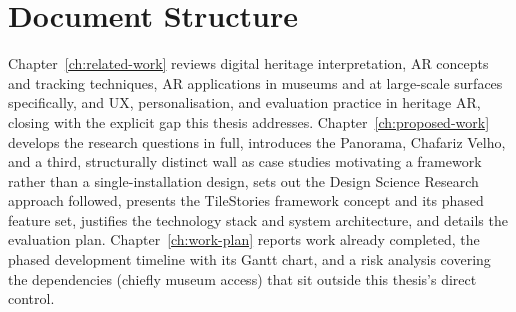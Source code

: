 \section{Document Structure}
\label{sec:intro-structure}

Chapter~\ref{ch:related-work} reviews digital heritage interpretation,
AR concepts and tracking techniques, AR applications in museums and at
large-scale surfaces specifically, and UX, personalisation, and
evaluation practice in heritage AR, closing with the explicit gap this
thesis addresses. Chapter~\ref{ch:proposed-work} develops the research
questions in full, introduces the Panorama, Chafariz Velho, and a third,
structurally distinct wall as case studies motivating a framework rather
than a single-installation design, sets out the Design Science Research
approach followed, presents the TileStories framework concept and its
phased feature set, justifies the technology stack and system
architecture, and details the evaluation plan. Chapter~\ref{ch:work-plan} reports work already completed, the
phased development timeline with its Gantt chart, and a risk analysis
covering the dependencies (chiefly museum access) that sit outside this
thesis's direct control.